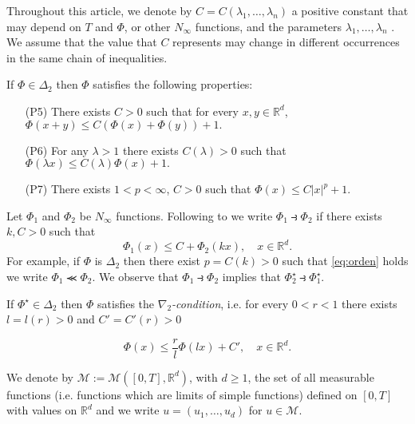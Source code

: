 \documentclass[twoside]{article}
\makeatletter
\theoremstyle{remark}
\newcounter{example}[section]
\def\namedlabel#1#2{\begingroup
    #2%
    \def\@currentlabel{#2}%
    \phantomsection\label{#1}\endgroup
}
\newcommand{\rr}{\mathbb{R}}
\renewcommand{\leq}{\leqslant}
\renewcommand{\geq}{\geqslant}
\makeatother
\begin{document}
Throughout this article, we denote by $C=C(\lambda_1,\ldots,\lambda_n)$ a positive constant that may depend on $T$ and $\Phi$,  or other $N_{\infty}$ functions, and the parameters $\lambda_1,\ldots,\lambda_n$ . We assume that the value that $C$ represents may change in 
different occurrences in the same chain of inequalities. 




If $\Phi\in\Delta_2$ then $\Phi$ satisfies the following properties:
\begin{enumerate}
 \item[\namedlabel{eq:quasi-sub-aditividad}{(P5)}] There exists $C>0$ such that for every $x,y\in \rr^d$, $\Phi(x+y)\leq C (\Phi(x)+\Phi(y))+1.$
\item[\namedlabel{{eq:delta2-lambda}}{(P6)}]  For any $\lambda>1$ there exists $C(\lambda)>0$ such that $\Phi(\lambda x)\leq C(\lambda)\Phi(x)+1.$
\item [\namedlabel{{eq:delta2-power}}{(P7)}] There exists $1<p<\infty$, $C>0$ such that $\Phi(x)\leq C|x|^p+1$.

\end{enumerate}


Let $\Phi_1$ and $\Phi_2$ be   $N_{\infty}$ functions. Following to \cite{trudinger1974imbedding} we write $\Phi_1\strictif\Phi_2$ if there exists  $k,C>0$ such that
\begin{equation}\label{eq:orden} \Phi_1(x)\leq C+\Phi_2(kx),\quad x\in\rr^d.\end{equation}
For example, if $\Phi$ is $\Delta_2$ then there exist $p =C(k)>0$ such that \eqref{eq:orden} holds we write  $\Phi_1\llcurly\Phi_2$.  We observe that  $\Phi_1\strictif \Phi_2$ implies that $\Phi^{\star}_2\strictif\Phi^{\star}_1$. 



If $\Phi^{\star}\in\Delta_2$ then $\Phi$ satisfies the \emph{$\nabla_2$-condition}, i.e.  for every $0<r<1$ there exists $l=l(r)>0$ and $C'=C'(r)>0$ 

\begin{equation}\label{eq:nabla2}
  \Phi(x)\leq \frac{r}{l}\Phi(l x)+C',\quad x\in\rr^d.
\end{equation}





 We denote by $\mathcal{M}:=\mathcal{M}\left([0,T],\rr^d\right)$, with $d\geq 1$,  the set of all measurable functions (i.e. functions which are limits of simple functions)  defined on $[0,T]$ with values on $\mathbb{R}^d$ and  we write $u=(u_1,\dots,u_d)$ for  $u\in \mathcal{M}$.
\end{document}
